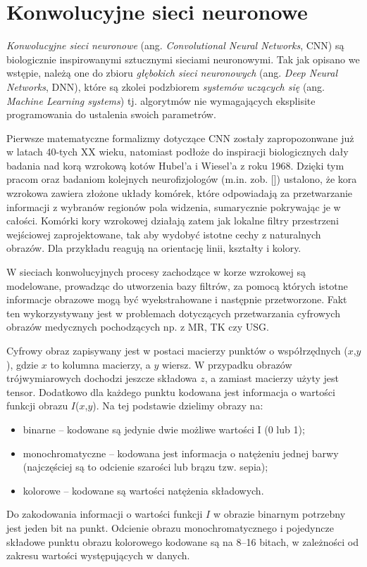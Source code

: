 \chapter{Konwolucyjne sieci neuronowe}
\textit{Konwolucyjne sieci neuronowe} (ang. \textit{Convolutional Neural Networks}, CNN) są biologicznie inspirowanymi sztucznymi sieciami neuronowymi. Tak jak opisano we wstępie, należą one do zbioru \textit{głębokich sieci neuronowych} (ang. \textit{Deep Neural Networks}, DNN), które są zkolei podzbiorem \textit{systemów uczących się} (ang. \textit{Machine Learning systems}) tj. algorytmów nie wymagających eksplisite programowania do ustalenia swoich parametrów.

Pierwsze matematyczne formalizmy dotyczące CNN zostały zapropozonwane już w latach 40-tych XX wieku, natomiast podłoże do inspiracji biologicznych dały badania nad korą wzrokową kotów Hubel'a i Wiesel’a z roku 1968. Dzięki tym pracom oraz badaniom kolejnych neurofizjologów (m.in. zob. []) ustalono, że kora wzrokowa zawiera złożone układy komórek, które odpowiadają za przetwarzanie informacji z wybranów regionów pola widzenia, sumarycznie pokrywając je w całości. Komórki kory wzrokowej działają zatem jak lokalne filtry przestrzeni wejściowej zaprojektowane, tak aby wydobyć istotne cechy z naturalnych obrazów. Dla przykładu reagują na orientację linii, kształty i kolory.

W sieciach konwolucyjnych procesy zachodzące w korze wzrokowej są modelowane, prowadząc do utworzenia bazy filtrów, za pomocą których istotne informacje obrazowe mogą być wyekstrahowane i następnie przetworzone. Fakt ten wykorzystywany jest w problemach dotyczących przetwarzania cyfrowych obrazów medycznych pochodzących np. z MR, TK czy USG.

Cyfrowy obraz zapisywany jest w postaci macierzy punktów o współrzędnych ($x$,$y$), gdzie $x$ to kolumna macierzy, a $y$ wiersz. W przypadku obrazów trójwymiarowych dochodzi jeszcze składowa $z$, a zamiast macierzy użyty jest tensor. Dodatkowo dla każdego punktu kodowana jest informacja o wartości funkcji obrazu $I$($x$,$y$). Na tej podstawie dzielimy obrazy na:
\begin{itemize}
	\item binarne – kodowane są jedynie dwie możliwe wartości I (0 lub 1);
	\item monochromatyczne – kodowana jest informacja o natężeniu jednej barwy (najczęściej są to odcienie szarości lub brązu tzw. sepia);
	\item kolorowe – kodowane są wartości natężenia składowych.
\end{itemize}
Do zakodowania informacji o wartości funkcji $I$ w obrazie binarnym potrzebny jest jeden bit na punkt. Odcienie obrazu monochromatycznego i pojedyncze składowe punktu obrazu kolorowego kodowane są na 8–16 bitach, w zależności od zakresu wartości występujących w danych. 

